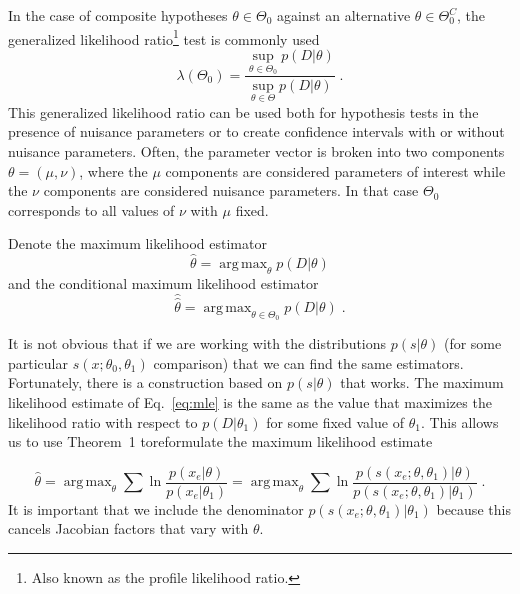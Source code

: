 \documentclass[12pt]{article}
\DeclareMathOperator*{\argmax}{arg\,max}
\numberwithin{equation}{section}
\theoremstyle{plain}
\begin{document}
In the case of composite hypotheses $\theta \in \Theta_0$ against an alternative
$\theta \in \Theta_0^C$, the generalized likelihood ratio\footnote{Also known as
the profile likelihood ratio.} test is commonly used
\begin{equation}
\lambda(\Theta_0) =  \frac{ \sup_{\theta \in \Theta_0} p(D | \theta)}{ \sup_{\theta \in \Theta} p(D | \theta)} \; .
\end{equation}
This generalized likelihood ratio can be used both for hypothesis tests in the
presence of nuisance parameters or to create confidence intervals with or
without nuisance parameters.  Often, the parameter vector is broken into two
components $\theta=(\mu,\nu)$, where the $\mu$ components are considered
parameters of interest while the $\nu$ components are considered nuisance
parameters. In that case $\Theta_0$ corresponds to all values of $\nu$ with
$\mu$ fixed.

Denote the maximum likelihood estimator
\begin{equation}\label{eq:mle}
\hat{\theta} = \argmax_\theta  p(D | \theta)
\end{equation}
and the conditional maximum likelihood estimator
\begin{equation}\label{eq:cmle}
\hat{\hat{\theta}} = \argmax_{\theta \in \Theta_0}  p(D | \theta) \; .
\end{equation}

It is not obvious that if we are working with the distributions $p(s|\theta)$
(for some particular $s(x; \theta_0, \theta_1)$ comparison) that we can find the
same estimators. Fortunately, there is a construction based on $p(s|\theta)$
that works. The maximum likelihood estimate of Eq.~\ref{eq:mle} is the same as
the value that maximizes the likelihood ratio with respect to $p(D|\theta_1)$
for some fixed value of $\theta_1$. This allows us to use Theorem~1 toreformulate the maximum likelihood estimate

\begin{equation}\label{eq:mle_withs}
\hat{\theta} = %
\argmax_\theta  \sum \ln \frac{p(x_e | \theta)}{p(x_e|\theta_1)} = \argmax_\theta  \sum \ln \frac{p(s(x_e; \theta, \theta_1) | \theta)}{p(s(x_e; \theta, \theta_1) |\theta_1)} \; .
\end{equation}
It is important that we include the denominator $p(s(x_e; \theta, \theta_1)
|\theta_1)$ because this cancels Jacobian factors that vary with $\theta$.
\end{document}
